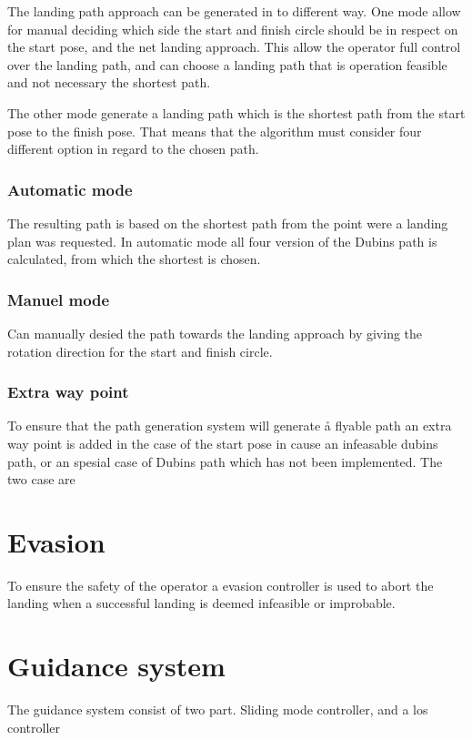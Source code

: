 The landing path approach can be generated in to different way. One mode allow for manual deciding which side the start and finish circle should be in respect on the start pose, and the net landing approach. This allow the operator full control over the landing path, and can choose a landing path that is operation feasible and not necessary the shortest path.

The other mode generate a landing path which is the shortest path from the start pose to the finish pose. That means that the algorithm must consider four different option in regard to the chosen path.
\subsubsection{Automatic mode}
The resulting path is based on the shortest path from the point were a landing plan was requested. In automatic mode all four version of the Dubins path is calculated, from which the shortest is chosen.
\subsubsection{Manuel mode}
Can manually desied the path towards the landing approach by giving the rotation direction for the start and finish circle. 
\subsubsection{Extra way point}
To ensure that the path generation system will generate å flyable path an extra way point is added in the case of the start pose in cause an infeasable dubins path, or an spesial case of Dubins path which has not been implemented. The two case are
\begin{subequations}
\end{subequations}
\section{Evasion}
To ensure the safety of the operator a evasion controller is used to abort the landing when a successful landing is deemed infeasible or improbable.

\section{Guidance system}
The guidance system consist of two part. Sliding mode controller, and a los controller

